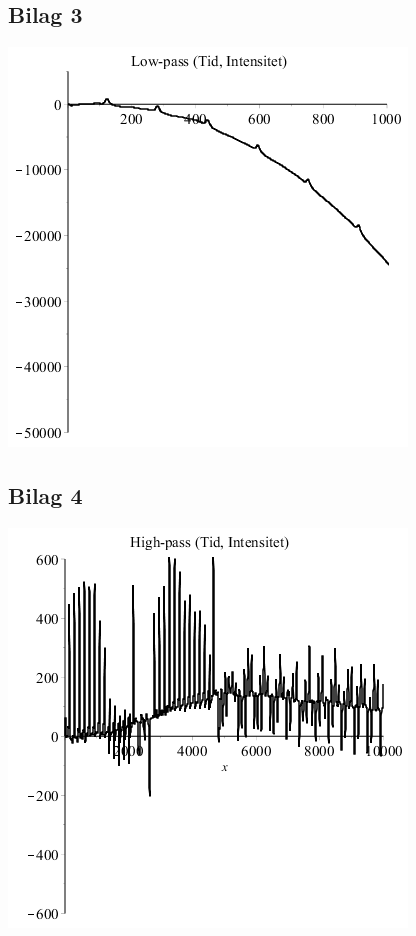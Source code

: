 \documentclass{article}
\begin{document}
\subsection*{Bilag 3}
\includegraphics[scale=0.6]{Filter1.png}
\subsection*{Bilag 4}
\includegraphics[scale=0.6]{Filter2.png}
\end{document}
